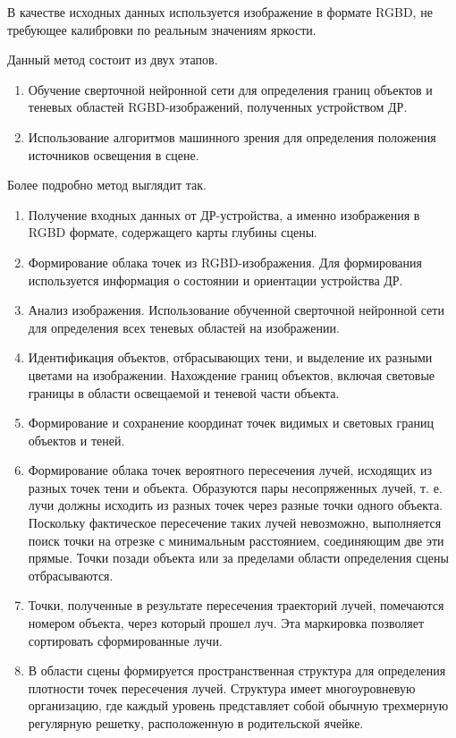 В качестве исходных данных используется изображение в формате RGBD, не требующее калибровки по реальным значениям яркости.

Данный метод состоит из двух этапов.
\begin{enumerate}
	\item Обучение сверточной нейронной сети для определения границ объектов и теневых областей RGBD-изображений, полученных устройством ДР.
	\item Использование алгоритмов машинного зрения для определения положения источников освещения в сцене.
\end{enumerate}

Более подробно метод выглядит так.

\begin{enumerate}
	\item Получение входных данных от ДР-устройства, а именно изображения в RGBD формате, содержащего карты глубины сцены.
	\item Формирование облака точек из RGBD-изображения. Для
	формирования используется информация о состоянии и ориентации устройства ДР.
	\item Анализ изображения. Использование обученной сверточной нейронной сети для определения всех теневых областей на изображении.
	\item Идентификация объектов, отбрасывающих тени, и выделение их разными цветами на изображении. Нахождение границ объектов, включая световые границы в области освещаемой и теневой части объекта.
	\item Формирование и сохранение координат точек видимых и световых границ объектов и теней. 
	\item Формирование облака точек вероятного пересечения лучей, исходящих из разных точек тени и объекта. Образуются пары несопряженных лучей, т. е. лучи должны исходить из разных точек через разные точки одного объекта. Поскольку фактическое пересечение таких лучей невозможно, выполняется поиск точки на отрезке с минимальным расстоянием, соединяющим две эти прямые. Точки позади объекта или за пределами области определения сцены отбрасываются. 
	\item Точки, полученные в результате пересечения траекторий лучей, помечаются номером объекта, через который прошел луч. Эта маркировка позволяет сортировать сформированные лучи.
	\item В области сцены формируется пространственная структура для определения плотности точек пересечения лучей. Структура имеет многоуровневую организацию, где каждый уровень представляет собой обычную трехмерную регулярную решетку, расположенную в родительской ячейке.

\end{enumerate}
